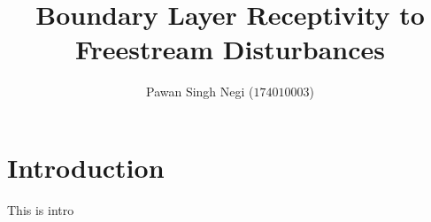 \documentclass[twoside]{iitbreport}
\begin{document}
\setcounter{page}{1}

\title{Boundary Layer Receptivity to Freestream Disturbances}
\author{Pawan Singh Negi ($174010003$) }












\maketitle

\pagebreak
\section{Introduction}
This is intro
\label{intro}
\end{document}
